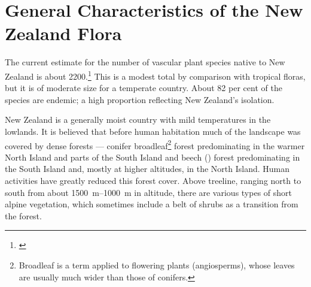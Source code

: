 \chapter{General Characteristics of the New Zealand Flora}

The current estimate for the number of vascular plant species native to New Zealand is about 2200.\footnote{\cite{druce1984indigenous}}
This is a modest total by comparison with tropical floras, but it is of moderate size for a temperate country.
About 82 per cent of the species are endemic; a high proportion reflecting New Zealand's isolation.

New Zealand is a generally moist country with mild temperatures in the lowlands.
It is believed that before human habitation much of the landscape was covered by dense forests --- conifer broadleaf\footnote{Broadleaf is a term applied to flowering plants (angiosperms), whose leaves are usually much wider than those of conifers.} forest predominating in the warmer North Island and parts of the South Island and beech () forest predominating in the South Island and, mostly at higher altitudes, in the North Island.
Human activities have greatly reduced this forest cover.
Above treeline, ranging north to south from about \SIrange{1500}{1000}{\metre} in altitude, there are various types of short alpine vegetation, which sometimes include a belt of shrubs as a transition from the forest.

